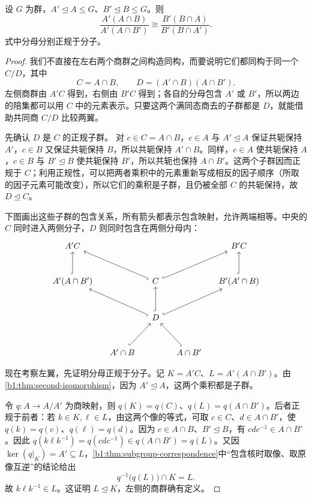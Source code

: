 \begin{lemma}[Zassenhaus]\label{b1:lem:butterfly}
	设 \(G\) 为群，\(A'\trianglelefteq A\leq G\)、\(B'\trianglelefteq B\leq G\)。则
	\[
		\frac{A'(A\cap B)}{A'(A\cap B')} \cong \frac{B'(B\cap A)}{B'(B\cap A')}.
	\]
	式中分母分别正规于分子。
\end{lemma}
\begin{proof}
	我们不直接在左右两个商群之间构造同构，而要说明它们都同构于同一个 \(C/D\)，其中
	\[
		C=A\cap B,\qquad D=(A'\cap B)(A\cap B').
	\]
	左侧商群由 \(A'C\) 得到，右侧由 \(B'C\) 得到；各自的分母包含 \(A'\) 或 \(B'\)，所以两边的陪集都可以用 \(C\) 中的元素表示。只要这两个满同态商去的子群都是 \(D\)，就能借助共同商 \(C/D\) 比较两翼。

	先确认 \(D\) 是 \(C\) 的正规子群。 对 \(c\in C=A\cap B\)，\(c\in A\) 与 \(A'\trianglelefteq A\) 保证共轭保持 \(A'\)，\(c\in B\) 又保证共轭保持 \(B\)，所以共轭保持 \(A'\cap B\)。同样，\(c\in A\) 使共轭保持 \(A\)，\(c\in B\) 与 \(B'\trianglelefteq B\) 使共轭保持 \(B'\)，所以共轭也保持 \(A\cap B'\)。这两个子群因而正规于 \(C\)；利用正规性，可以把两者乘积中的元素重新写成相反的因子顺序（所取的因子元素可能改变），所以它们的乘积是子群，且仍被全部 \(C\) 的共轭保持，故 \(D\trianglelefteq C\)。

	下图画出这些子群的包含关系，所有箭头都表示包含映射，允许两端相等。中央的 \(C\) 同时进入两侧分子，\(D\) 则同时包含在两侧分母内：
	\[
		\begin{tikzcd}[row sep=large, column sep=small]
			A'C &&&& B'C \\
			A'(A\cap B') \arrow[u,hook] && C \arrow[ull,hook] \arrow[urr,hook] && B'(A'\cap B) \arrow[u,hook] \\
			&& D \arrow[ull,hook] \arrow[u,hook] \arrow[urr,hook] && \\
			& A'\cap B \arrow[ur,hook] && A\cap B' \arrow[ul,hook] &
		\end{tikzcd}
	\]

	现在考察左翼，先证明分母正规于分子。记 \(K=A'C\)、\(L=A'(A\cap B')\)。由\cref{b1:thm:second-isomorphism}，因为 \(A'\trianglelefteq A\)，这两个乘积都是子群。

	令 \(q:A\to A/A'\) 为商映射，则 \(q(K)=q(C)\)、\(q(L)=q(A\cap B')\)。后者正规于前者：若 \(k\in K,\ell\in L\)，由这两个像的等式，可取 \(c\in C\)、\(d\in A\cap B'\)，使 \(q(k)=q(c)\)、\(q(\ell)=q(d)\)。因为 \(c\in A\cap B\)、\(B'\trianglelefteq B\)，有 \(cdc^{-1}\in A\cap B'\)。因此 \(q(k\ell k^{-1})=q(cdc^{-1})\in q(A\cap B')=q(L)\)。又因 \(\ker(q|_K)=A'\subseteq L\)，\cref{b1:thm:subgroup-correspondence}中“包含核时取像、取原像互逆”的结论给出
	\[
		q^{-1}\bigl(q(L)\bigr)\cap K=L.
	\]
	故 \(k\ell k^{-1}\in L\)。这证明 \(L\trianglelefteq K\)，左侧的商群确有定义。


\end{proof}
